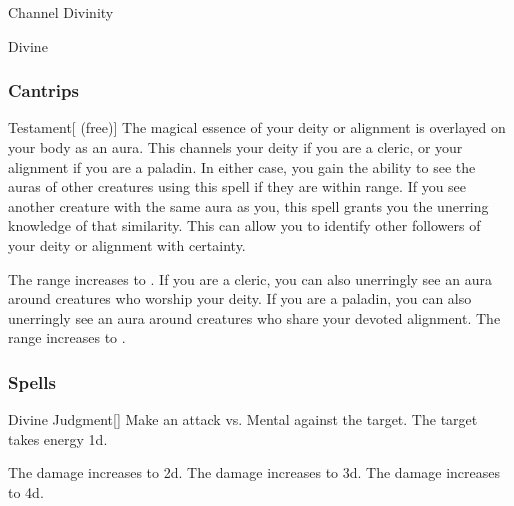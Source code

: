 \newpage
\begin{spellsection}{Channel Divinity}

\begin{spellheader}
\end{spellheader}


 Divine

\subsubsection{Cantrips}


\begin{freeability}{Testament}[ (free)]
The magical essence of your deity or alignment is overlayed on your body as an aura.
This channels your deity if you are a cleric, or your alignment if you are a paladin.
In either case, you gain the ability to see the auras of other creatures using this spell if they are within \rngclose range.
If you see another creature with the same aura as you, this spell grants you the unerring knowledge of that similarity.
This can allow you to identify other followers of your deity or alignment with certainty.

\rankline
{} The range increases to \rngmed.
 If you are a cleric, you can also unerringly see an aura around creatures who worship your deity.
If you are a paladin, you can also unerringly see an aura around creatures who share your devoted alignment.
 The range increases to \rngext.
\end{freeability}

\end{spellsection}


\subsubsection{Spells}


\lowercase{\hypertarget{spell:Divine Judgment}{}}\label{spell:Divine Judgment}
\begin{freeability}[Rank 1]{\hypertarget{spell:Divine Judgment}{Divine Judgment}}[]
Make an attack vs. Mental against the target.
\hit The target takes energy  \plus1d.

\rankline
{} The damage increases to  \plus2d.
 The damage increases to  \plus3d.
 The damage increases to  \plus4d.
\end{freeability}
\vspace{0.25em}



